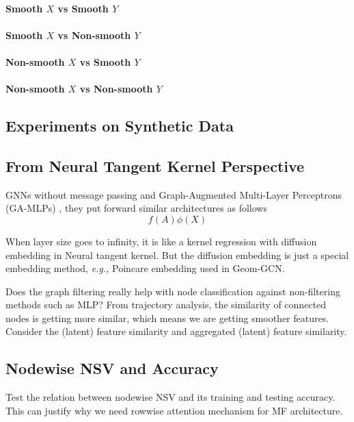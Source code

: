 \documentclass{article}
\newcommand\eg{\textit{e.g.,}}
\newcommand{\0}{{\boldsymbol{0}}}
\newcommand{\6}{{\partial}}
\newcommand{\8}{{\infty}}
\newcommand{\4}{{\nabla}}
\begin{document}
\paragraph{Smooth $X$ vs Smooth $Y$}

\paragraph{Smooth $X$ vs Non-smooth $Y$}

\paragraph{Non-smooth $X$ vs Smooth $Y$}

\paragraph{Non-smooth $X$ vs Non-smooth $Y$}

\subsection{Experiments on Synthetic Data}



\fi
\iffalse
\subsection{From Neural Tangent Kernel Perspective}

GNNs without message passing \cite{hamilton2020graph} and Graph-Augmented Multi-Layer Perceptrons (GA-MLPs) \cite{chen2020graph}, they put forward similar architectures as follows
\begin{equation}
    f(A)\phi(X)
\end{equation}

When layer size goes to infinity, it is like a kernel regression with diffusion embedding in Neural tangent kernel. But the diffusion embedding is just a special embedding method, \eg{} Poincare embedding used in Geom-GCN.

Does the graph filtering really help with node classification against non-filtering methods such as MLP? From trajectory analysis\cite{mengunderstanding}, the similarity of connected nodes is getting more similar, which means we are getting smoother features. Consider the (latent) feature similarity and aggregated (latent) feature similarity.
\subsection{Nodewise NSV and Accuracy}
Test the relation between nodewise NSV and its training and testing accuracy. This can justify why we need rowwise attention mechanism for MF architecture.
\end{document}
